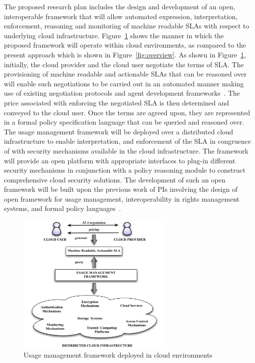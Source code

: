 \documentclass[times, 10pt,twocolumn]{article}
\begin{document}
The proposed research plan includes the design and development of an open, interoperable framework that will allow automated expression, interpretation, enforcement, reasoning and monitoring of machine readable SLAs with respect to underlying cloud infrastructure. Figure~\ref{fig:cloud-umf} shows the manner in which the proposed framework will operate within cloud environments, as compared to the present approach which is shown in Figure~\ref{fig:overview}. As shown in Figure~\ref{fig:cloud-umf}, initially, the cloud provider and the cloud user negotiate the terms of SLA. The provisioning of machine readable and actionable SLAs that can be reasoned over will enable such negotiations to be carried out in an automated manner making use of existing negotiation protocols and agent development frameworks~\cite{BePoRi:02,FIPA}. The price associated with enforcing the negotiated SLA is then determined and conveyed to the cloud user. Once the terms are agreed upon, they are represented in a formal policy specification language that can be queried and reasoned over. The usage management framework will be deployed over a distributed cloud infrastructure to enable interpretation, and enforcement of the SLA in congruence of with security mechanisms available in the cloud infrastructure. The framework will provide an open platform with appropriate interfaces to plug-in different security mechanisms in conjunction with a policy reasoning module to construct comprehensive cloud security solutions. The development of such an open framework will be built upon the previous work of PIs involving the design of open framework for usage management, interoperability in rights management systems, and formal policy languages~\cite{JaHe:09,JaHeLa:10}.


\begin{figure}[!t]
\centering
\includegraphics[width=3in]{cloud-umf.pdf}
\caption{Usage management framework deployed in cloud environments}
\label{fig:cloud-umf}
\end{figure}
\end{document}
